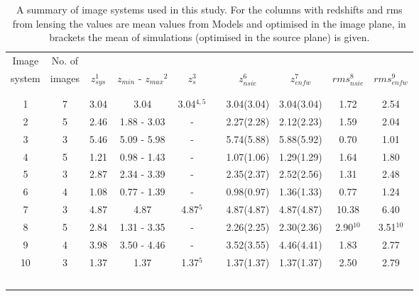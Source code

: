 \documentclass[useAMS,usenatbib]{mn2e}
\newcounter{one}   \setcounter{one}{1}
\newcounter{two}   \setcounter{two}{2}
\begin{document}
\begin{table}
  \centering
  \caption[]{A summary of image systems used in this study. For the
 columns with redshifts and rms from lensing the values are mean
 values from Models  and  optimised in the image
 plane, in brackets the mean of simulations (optimised in the source
 plane) is given.}
  \begin{tabular}{cccccccccc}
    \cline{1-5}\cline{7-10}\\[-2mm]
    Image  & No. of  \\
    system &  images & $z_{sys}^1$ & $z_{min}$ - $z_{max} $$^2$ & $z_s^3$ && $z_{nsie}^6$  & $z_{enfw}^7$ & $rms_{nsie}^8$ & $rms_{enfw}^9$ \\[1mm]
    \cline{1-5}\cline{7-10}\\[-2.8mm]
    \cline{1-5}\cline{7-10}\\[-2mm]
       1 &  7 & 3.04 &     3.04    &  3.04$^{4,5}$ &&  3.04\quad(3.04) &  3.04\quad(3.04) &    1.72      &  2.54      \\ %
       2 &  5 & 2.46 & 1.88 - 3.03 &       -       &&  2.27\quad(2.28) &  2.12\quad(2.23) &    1.59      &  2.04      \\ %
       3 &  3 & 5.46 & 5.09 - 5.98 &       -       &&  5.74\quad(5.88) &  5.88\quad(5.92) &    0.70      &  1.01      \\ %
       4 &  5 & 1.21 & 0.98 - 1.43 &       -       &&  1.07\quad(1.06) &  1.29\quad(1.29) &    1.64      &  1.80      \\ %
       5 &  3 & 2.87 & 2.34 - 3.39 &       -       &&  2.35\quad(2.37) &  2.52\quad(2.56) &    1.31      &  2.48      \\ %
       6 &  4 & 1.08 & 0.77 - 1.39 &       -       &&  0.98\quad(0.97) &  1.36\quad(1.33) &    0.77      &  1.24      \\ %
       7 &  3 & 4.87 &     4.87    &  4.87$^{5}$   &&  4.87\quad(4.87) &  4.87\quad(4.87) &   10.38      &  6.40      \\ %
       8 &  5 & 2.84 & 1.31 - 3.35 &       -       &&  2.26\quad(2.25) &  2.30\quad(2.36) &    2.90$^{10}$ &  3.51$^{10}$ \\ %
       9 &  4 & 3.98 & 3.50 - 4.46 &       -       &&  3.52\quad(3.55) &  4.46\quad(4.41) &    1.83      &  2.77      \\ %
      10 &  3 & 1.37 &     1.37    &  1.37$^{5}$   &&  1.37\quad(1.37) &  1.37\quad(1.37) &    2.50      &  2.79      \\ %
$$
\end{tabular}
\end{table}
\end{document}
